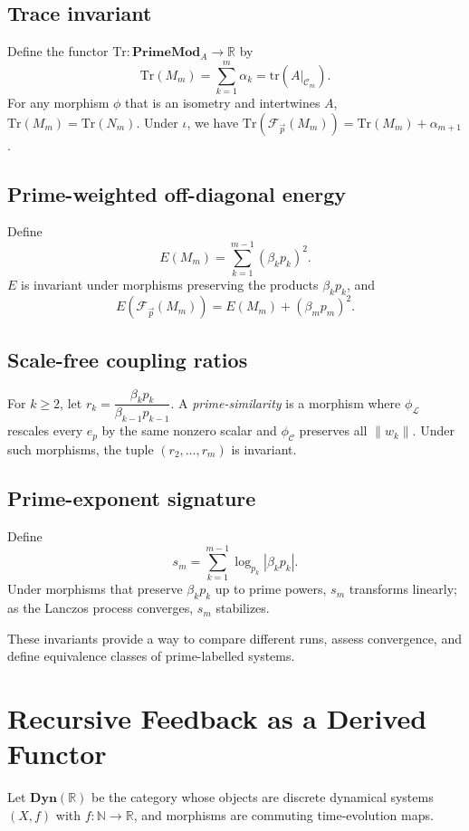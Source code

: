\documentclass[12pt]{article}
\theoremstyle{plain}
\theoremstyle{definition}
\theoremstyle{remark}
\begin{document}
\subsection{Trace invariant}
Define the functor $\mathrm{Tr} : \mathbf{PrimeMod}_A \to \mathbb{R}$ by
\[
\mathrm{Tr}(M_m) = \sum_{k=1}^m \alpha_k = \mathrm{tr}(A|_{\mathcal{C}_m}).
\]
For any morphism $\phi$ that is an isometry and intertwines $A$, $\mathrm{Tr}(M_m) = \mathrm{Tr}(N_m)$. 
Under $\iota$, we have $\mathrm{Tr}(\mathcal{F}_{\vec{p}}(M_m)) = \mathrm{Tr}(M_m) + \alpha_{m+1}$.

\subsection{Prime-weighted off-diagonal energy}
Define
\[
E(M_m) = \sum_{k=1}^{m-1} (\beta_k p_k)^2.
\]
$E$ is invariant under morphisms preserving the products $\beta_k p_k$, and
\[
E(\mathcal{F}_{\vec{p}}(M_m)) = E(M_m) + (\beta_m p_m)^2.
\]

\subsection{Scale-free coupling ratios}
For $k\ge 2$, let $r_k = \dfrac{\beta_k p_k}{\beta_{k-1} p_{k-1}}$.
A \emph{prime-similarity} is a morphism where $\phi_{\mathcal{L}}$ rescales every $e_p$ by the same nonzero scalar and $\phi_{\mathcal{C}}$ preserves all $\|w_k\|$. 
Under such morphisms, the tuple $(r_2,\dots,r_m)$ is invariant.

\subsection{Prime-exponent signature}
Define
\[
s_m = \sum_{k=1}^{m-1} \log_{p_k} |\beta_k p_k|.
\]
Under morphisms that preserve $\beta_k p_k$ up to prime powers, $s_m$ transforms linearly; as the Lanczos process converges, $s_m$ stabilizes.

These invariants provide a way to compare different runs, assess convergence, and define equivalence classes of prime-labelled systems.

\section{Recursive Feedback as a Derived Functor}\label{sec:feedback}
Let $\mathbf{Dyn}(\mathbb{R})$ be the category whose objects are discrete dynamical systems $(X, f)$ with $f:\mathbb{N}\to\mathbb{R}$, and morphisms are commuting time-evolution maps.
\end{document}
